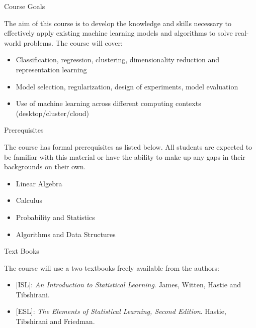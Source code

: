 \documentclass[serif,xcolor=pdftex,dvipsnames,table,hyperref={bookmarks=false,breaklinks}]{beamer}
\begin{document}
\begin{frame}[t]{Course Goals}

The aim of this course is to develop the knowledge and skills necessary to effectively apply existing machine learning models and algorithms to solve real-world problems. The course will cover:

\pause
\begin{itemize} [<+->]
\item Classification, regression, clustering, dimensionality reduction and representation learning 
\item Model selection, regularization, design of experiments, model evaluation
\item Use of machine learning across different computing contexts (desktop/cluster/cloud)
\end{itemize}


\end{frame}

\begin{frame}[t]{Prerequisites}

The course has formal prerequisites as listed below. All students are expected to be familiar with this material or have the ability to make up any gaps in their backgrounds on their own.

\begin{itemize} [<+->]
\item Linear Algebra
\item Calculus
\item Probability and Statistics
\item Algorithms and Data Structures 
\end{itemize}


\end{frame}


\begin{frame}[t,label=current]{Text Books}

The course will use a two textbooks freely available from the authors:

\pause
\begin{itemize}[<+->]
\item {[ISL]}: \textit{An Introduction to Statistical Learning}. James, Witten, Hastie and Tibshirani.
\item {[ESL]}: \textit{The Elements of Statistical Learning, Second Edition}. Hastie, Tibshirani and Friedman.
\end{itemize}


\end{frame}
\end{document}
